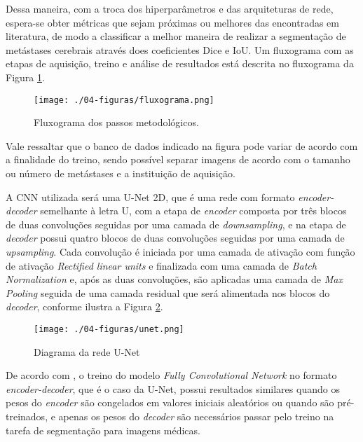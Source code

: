 Dessa maneira, com a troca dos hiperparâmetros e das arquiteturas de rede, espera-se obter métricas que sejam próximas ou melhores das encontradas em literatura, de modo a classificar a melhor maneira de realizar a segmentação de metástases cerebrais através does coeficientes Dice e IoU. Um fluxograma com as etapas de aquisição, treino e análise de resultados está descrita no fluxograma da Figura \ref{fig:fluxograma}.


\begin{figure}[!htb]
\centering
    \texttt{[image: ./04-figuras/fluxograma.png]}
	\caption{Fluxograma dos passos metodológicos.}\vspace{-0.2cm}
    \label{fig:fluxograma}
\end{figure}

Vale ressaltar que o banco de dados indicado na figura pode variar de acordo com a finalidade do treino, sendo possível separar imagens de acordo com o tamanho ou número de metástases e a instituição de aquisição.

A CNN utilizada será uma U-Net 2D, que é uma rede com formato \textit{encoder-decoder} semelhante à letra U, com a etapa de \textit{encoder} composta por três blocos de duas convoluções seguidas por uma camada de \textit{downsampling}, e na etapa de \textit{decoder} possui quatro blocos de duas convoluções seguidas por uma camada de \textit{upsampling}. Cada convolução é iniciada por uma camada de ativação com função de ativação \textit{Rectified linear units} e finalizada com uma camada de \textit{Batch Normalization} e, após as duas convoluções, são aplicadas uma camada de \textit{Max Pooling} seguida de uma camada residual que será alimentada nos blocos do \textit{decoder}, conforme ilustra a Figura \ref{fig:unet}.

\begin{figure}[!htb]
\centering
    \texttt{[image: ./04-figuras/unet.png]}
	\caption{Diagrama da rede U-Net}\vspace{-0.2cm}
    \label{fig:unet}
\end{figure}

De acordo com \cite{Karimi:2021}, o treino do modelo \textit{Fully Convolutional Network} no formato \textit{encoder-decoder}, que é o caso da U-Net, possui resultados similares quando os pesos do \textit{encoder} são congelados em valores iniciais aleatórios ou quando são pré-treinados, e apenas os pesos do \textit{decoder} são necessários passar pelo treino na tarefa de segmentação para imagens médicas.

